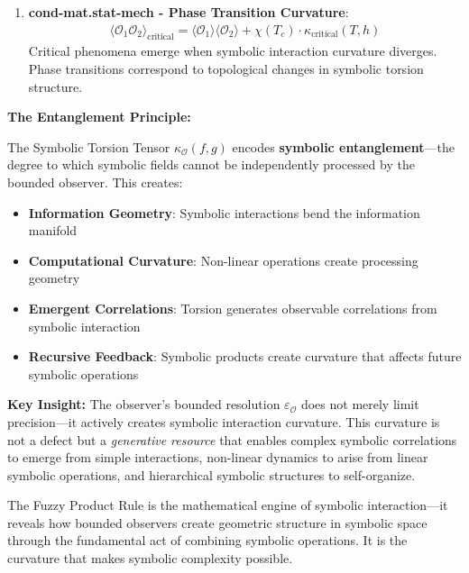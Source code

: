 \begin{scholium}
\begin{enumerate}
\item \textbf{cond-mat.stat-mech - Phase Transition Curvature}:
   \begin{align}
   \langle \mathcal{O}_1 \mathcal{O}_2 \rangle_{\text{critical}} = \langle \mathcal{O}_1 \rangle \langle \mathcal{O}_2 \rangle + \chi(T_c) \cdot \kappa_{\text{critical}}(T, h)
   \end{align}
   Critical phenomena emerge when symbolic interaction curvature diverges. Phase transitions correspond to topological changes in symbolic torsion structure.
\end{enumerate}
\end{scholium}

\textbf{The Entanglement Principle:}

The Symbolic Torsion Tensor $\kappa_{\mathcal{O}}(f, g)$ encodes \textbf{symbolic entanglement}---the degree to which symbolic fields cannot be independently processed by the bounded observer. This creates:

\begin{itemize}
\item \textbf{Information Geometry}: Symbolic interactions bend the information manifold
\item \textbf{Computational Curvature}: Non-linear operations create processing geometry  
\item \textbf{Emergent Correlations}: Torsion generates observable correlations from symbolic interaction
\item \textbf{Recursive Feedback}: Symbolic products create curvature that affects future symbolic operations
\end{itemize}

\textbf{Key Insight:} The observer's bounded resolution $\varepsilon_{\mathcal{O}}$ does not merely limit precision---it actively creates symbolic interaction curvature. This curvature is not a defect but a \textit{generative resource} that enables complex symbolic correlations to emerge from simple interactions, non-linear dynamics to arise from linear symbolic operations, and hierarchical symbolic structures to self-organize.

The Fuzzy Product Rule is the mathematical engine of symbolic interaction---it reveals how bounded observers create geometric structure in symbolic space through the fundamental act of combining symbolic operations. It is the curvature that makes symbolic complexity possible.

